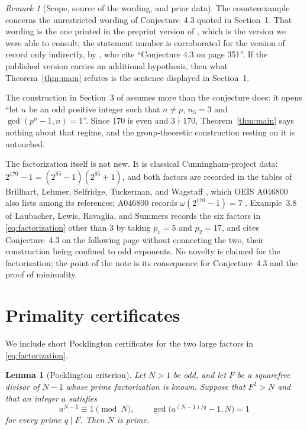 \documentclass[11pt]{amsart}
\newtheorem{lemma}[theorem]{Lemma}
\theoremstyle{remark}
\newtheorem{remark}[theorem]{Remark}
\begin{document}
\begin{remark}[Scope, source of the wording, and prior data]
\label{rem:scope}
The counterexample concerns the unrestricted wording of
Conjecture~4.3 quoted in Section~1. That wording is the one printed in
the preprint version of \cite{DHS}, which is the version we were able
to consult; the statement number is corroborated for the version of
record only indirectly, by \cite{LLRS}, who cite ``Conjecture 4.3 on
page 351''. If the published version carries an additional hypothesis,
then what Theorem~\ref{thm:main} refutes is the sentence displayed in
Section~1.

The construction in Section~3 of \cite{DHS} assumes more than the
conjecture does: it opens ``let $n$ be an odd positive integer such
that $n\ne p$, $n_3=3$ and $\gcd(p^n-1,n)=1$''. Since $170$ is even
and $3\nmid170$, Theorem~\ref{thm:main} says nothing about that
regime, and the group-theoretic construction resting on it is
untouched.

The factorization itself is not new. It is classical
Cunningham-project data: $2^{170}-1=(2^{85}-1)(2^{85}+1)$, and both
factors are recorded in the tables of Brillhart, Lehmer, Selfridge,
Tuckerman, and Wagstaff \cite{BLSTW}, which OEIS A046800 also lists
among its references; A046800 records $\omega(2^{170}-1)=7$
\cite{OEIS}.
Example~3.8 of Laubacher, Lewis, Ravaglia, and Summers \cite{LLRS}
records the six factors in \eqref{eq:factorization} other than $3$ by
taking $p_1=5$ and $p_2=17$, and cites Conjecture~4.3 on the following
page without connecting the two, their construction being confined to
odd exponents. No novelty is claimed for the factorization; the point
of the note is its consequence for Conjecture~4.3 and the proof of
minimality.
\end{remark}

\section{Primality certificates}

We include short Pocklington certificates for the two large factors in
\eqref{eq:factorization}.

\begin{lemma}[Pocklington criterion]\label{lem:pocklington}
Let $N>1$ be odd, and let $F$ be a squarefree divisor of $N-1$ whose
prime factorization is known. Suppose that $F^2>N$ and that an integer
$a$ satisfies
\[
a^{N-1}\equiv1\pmod N,
\qquad
\gcd\bigl(a^{(N-1)/q}-1,N\bigr)=1
\]
for every prime $q\mid F$. Then $N$ is prime.
\end{lemma}
\end{document}
